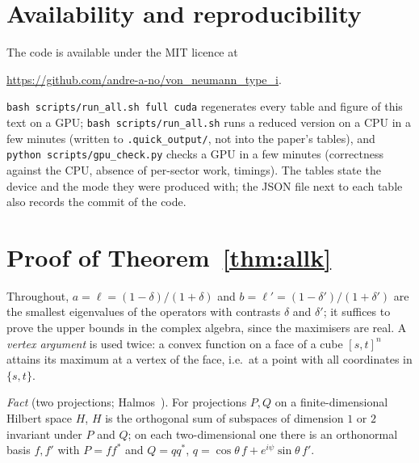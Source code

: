 \documentclass[11pt]{article}
\begin{document}
\section{Availability and reproducibility}

The code is available under the MIT licence at
\begin{center}\url{https://github.com/andre-a-no/von_neumann_type_i}.\end{center}
\texttt{bash scripts/run\_all.sh full cuda} regenerates every table and figure of this text on a GPU;
\texttt{bash scripts/run\_all.sh} runs a reduced version on a CPU in a few minutes (written to
\texttt{.quick\_output/}, not into the paper's tables), and \texttt{python scripts/gpu\_check.py} checks a GPU in a few
minutes (correctness against the CPU, absence of per-sector work, timings). The tables state the device and the mode
they were produced with; the JSON file next to each table also records the commit of the code.

\appendix
\section{Proof of Theorem~\ref{thm:allk}}\label{app:envelopes}

Throughout, $a=\ell=(1-\delta)/(1+\delta)$ and $b=\ell'=(1-\delta')/(1+\delta')$ are the smallest eigenvalues of the operators
with contrasts $\delta$ and $\delta'$; it suffices to prove the upper bounds in the complex algebra, since the
maximisers are real. A \emph{vertex argument} is used twice: a convex function on a face of a cube $[s,t]^n$ attains its
maximum at a vertex of the face, i.e.\ at a point with all coordinates in $\{s,t\}$.

\noindent\emph{Fact} (two projections; Halmos~\cite{halmos1969}). For projections $P,Q$ on a finite-dimensional
Hilbert space $H$, $H$ is the orthogonal sum of subspaces of dimension $1$ or $2$ invariant under $P$ and $Q$; on each
two-dimensional one there is an orthonormal basis $f,f'$ with $P=ff^*$ and $Q=qq^*$,
$q=\cos\theta\,f+e^{i\psi}\sin\theta\,f'$.
\end{document}
